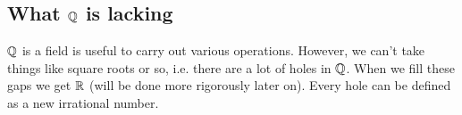 \subsection*{What $\mathbb{Q}$ is lacking}
$\mathbb{Q}$ is a field is useful to carry out various operations. However, we can't take things like square roots or so, i.e. there are a lot of holes in $\mathbb{Q}$. When we fill these gaps we get  $\mathbb{R}$ (will be done more rigorously later on). Every hole can be defined as a new irrational number.


